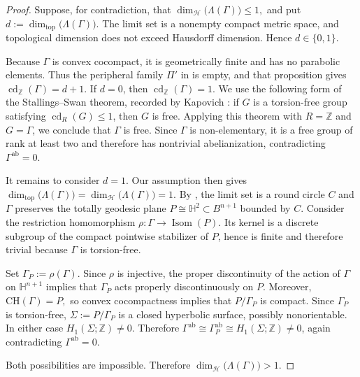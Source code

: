 \documentclass[12pt,oneside,a4paper]{article}
\theoremstyle{mytheorem}
\theoremstyle{remark}
\theoremstyle{definition}
\begin{document}
\begin{proof}
Suppose, for contradiction, that
$\dim_{\mathcal H}\!\bigl(\Lambda(\Gamma)\bigr)\leq 1,$ and put
$d:=\dim_{\mathrm{top}}\!\bigl(\Lambda(\Gamma)\bigr).$ The limit set is a
nonempty compact metric space, and topological dimension
does not exceed Hausdorff dimension. Hence $d\in\{0,1\}$.

Because $\Gamma$ is convex cocompact, it is geometrically finite and has no
parabolic elements. Thus the peripheral family $\Pi'$ in
\cite[Proposition~9.6]{MR2491697} is empty, and that proposition gives
$\operatorname{cd}_{\mathbb Z}(\Gamma)=d+1.$ If $d=0$, then
$\operatorname{cd}_{\mathbb Z}(\Gamma)=1$. We use the
following form of the Stallings--Swan theorem, recorded by Kapovich
\cite[Theorem~2.5]{MR2491697}: if $G$ is a torsion-free group satisfying
$\operatorname{cd}_R(G)\leq1$, then $G$ is free. Applying this theorem with
$R=\mathbb Z$ and $G=\Gamma$, we conclude that $\Gamma$ is free. Since
$\Gamma$ is non-elementary, it is a free group of rank at least two and
therefore has nontrivial abelianization, contradicting
$\Gamma^{\mathrm{ab}}=0$.

It remains to consider $d=1$. Our assumption then gives
$\dim_{\mathrm{top}}\!\bigl(\Lambda(\Gamma)\bigr)
 =
\dim_{\mathcal H}\!\bigl(\Lambda(\Gamma)\bigr)=1.$ By
\cite[Theorem~1.3]{MR2491697}, the limit set is a round circle $C$ and
$\Gamma$ preserves the totally geodesic plane
$P\cong\mathbb H^2\subset B^{n+1}$ bounded by $C$. Consider the restriction
homomorphism $\rho\colon\Gamma\to \operatorname{Isom}(P).$ Its kernel
is a discrete subgroup of the compact pointwise stabilizer of
$P$, hence is finite and therefore trivial because $\Gamma$ is torsion-free.

Set $\Gamma_P:=\rho(\Gamma)$. Since $\rho$ is injective, the proper
discontinuity of the action of $\Gamma$ on $\mathbb H^{n+1}$ implies that
$\Gamma_P$ acts properly discontinuously on $P$. Moreover,
$\mathrm{CH}(\Gamma)=P,$ so convex cocompactness implies that
$P/\Gamma_P$ is compact. Since $\Gamma_P$
is torsion-free, $\Sigma:=P/\Gamma_P$ is a closed hyperbolic surface, possibly
nonorientable. In either case $H_1(\Sigma;\mathbb Z)\neq0$. Therefore
$\Gamma^{\mathrm{ab}}\cong\Gamma_P^{\mathrm{ab}}
\cong H_1(\Sigma;\mathbb Z)\neq0$,
again contradicting $\Gamma^{\mathrm{ab}}=0$.

Both possibilities are impossible. Therefore
$\dim_{\mathcal H}\!\bigl(\Lambda(\Gamma)\bigr)>1$.
\end{proof}
\end{document}
